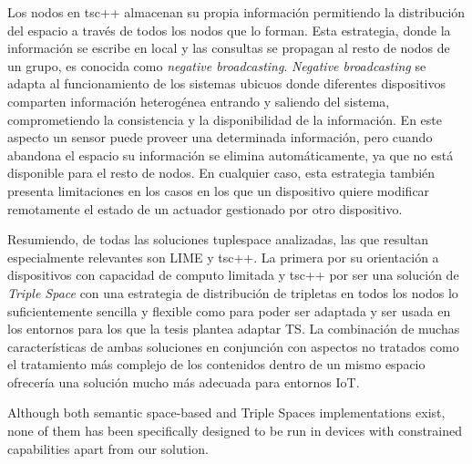 Los nodos en tsc++ almacenan su propia información permitiendo la distribución del espacio a través de todos los nodos que lo forman. Esta estrategia, donde la información se escribe en local y las consultas se propagan al resto de nodos de un grupo, es conocida como \textit{negative broadcasting}. \textit{Negative broadcasting} se adapta al funcionamiento de los sistemas ubicuos donde diferentes dispositivos comparten información heterogénea entrando y saliendo del sistema, comprometiendo la consistencia y la disponibilidad de la información. En este aspecto un sensor puede proveer una determinada información, pero cuando abandona el espacio su información se elimina automáticamente, ya que no está disponible para el resto de nodos. En cualquier caso, esta estrategia también presenta limitaciones en los casos en los que un dispositivo quiere modificar remotamente el estado de un actuador gestionado por otro dispositivo.

Resumiendo, de todas las soluciones tuplespace analizadas, las que resultan especialmente relevantes son LIME y tsc++. La primera por su orientación a dispositivos con capacidad de computo limitada y tsc++ por ser una solución de \textit{Triple Space} con una estrategia de distribución de tripletas en todos los nodos lo suficientemente sencilla y flexible como para poder ser adaptada y ser usada en los entornos para los que la tesis plantea adaptar TS. La combinación de muchas características de ambas soluciones en conjunción con aspectos no tratados como el tratamiento más complejo de los contenidos dentro de un mismo espacio ofrecería una solución mucho más adecuada para entornos IoT.





Although both semantic space-based and Triple Spaces implementations exist, none of them has been specifically designed to be run in devices with constrained capabilities apart from our solution.